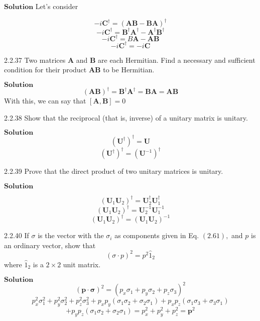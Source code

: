 \documentclass{article}
\begin{document}
\begin{flushleft}
$\boxed{\textbf{Solution}}$ Let's consider

$$-i \mathbf{C}^{\dagger}=(\mathbf{A}\mathbf{B}-\mathbf{B}\mathbf{A})^{\dagger}$$
$$-i \mathbf{C}^{\dagger}=\mathbf{B}^{\dagger} \mathbf{A}^{\dagger}-\mathbf{A}^{\dagger} \mathbf{B}^{\dagger}$$
$$-i \mathbf{C}^{\dagger}=B \mathbf{A}-\mathbf{A}\mathbf{B}$$
$$-i \mathbf{C}^{\dagger}=-i \mathbf{C}$$



\begin{mybox}{2.2.37}
Two matrices $\mathbf{A}$ and $\mathbf{B}$ are each Hermitian. Find a necessary and sufficient condition for
their product $\mathbf{AB}$ to be Hermitian.
\end{mybox}


$\boxed{\textbf{Solution}}$ 
$$(\mathbf{A}\mathbf{B})^{\dagger}=\mathbf{B}^{\dagger} \mathbf{A}^{\dagger}=\mathbf{B} \mathbf{A}=\mathbf{AB}$$
With this, we can say that $[\mathbf{A}, \mathbf{B}] = 0$



\begin{mybox}{2.2.38}
Show that the reciprocal (that is, inverse) of a unitary matrix is unitary.
\end{mybox}


$\boxed{\textbf{Solution}}$ 
$$\left( \mathbf{U}^{\dagger}\right)^{\dagger}=\mathbf{U}$$
$$\left( \mathbf{U}^{\dagger}\right)^{\dagger}=\left( \mathbf{U}^{-1}\right)^{\dagger}$$


\begin{mybox}{2.2.39}
Prove that the direct product of two unitary matrices is unitary.
\end{mybox}

$\boxed{\textbf{Solution}}$ 

$$\left( \mathbf{U}_{1}  \mathbf{U}_{2}\right)^{\dagger}= \mathbf{U}_{2}^{\dagger}  \mathbf{U}_{1}^{\dagger}$$
$$\left( \mathbf{U}_{1}  \mathbf{U}_{2}\right)^{\dagger}= \mathbf{U}_{2}^{-1}  \mathbf{U}_{1}^{-1}$$
$$\left( \mathbf{U}_{1}  \mathbf{U}_{2}\right)^{\dagger}=\left( \mathbf{U}_{1}  \mathbf{U}_{2}\right)^{-1}$$



\begin{mybox}{2.2.40}
If $\sigma$ is the vector with the $\sigma_{i}$ as components given in Eq. $(2.61),$ and $p$ is an ordinary vector, show that
$$(\sigma \cdot p)^{2}=p^{2} \hat{1}_{2}$$
where $\hat{1}_{2}$ is a $2 \times 2$ unit matrix.
\end{mybox}


$\boxed{\textbf{Solution}}$ 
$$(\mathbf{p} \cdot \boldsymbol{\sigma})^{2}=\left(p_{x} \sigma_{1}+p_{y} \sigma_{2}+p_{z} \sigma_{3}\right)^{2}$$
$$p_{x}^{2} \sigma_{1}^{2}+p_{y}^{2} \sigma_{2}^{2}+p_{z}^{2} \sigma_{3}^{2}+p_{x} p_{y}\left(\sigma_{1} \sigma_{2}+\sigma_{2} \sigma_{1}\right)+p_{x} p_{z}\left(\sigma_{1} \sigma_{3}+\sigma_{3} \sigma_{1}\right)$$
$$+p_{y} p_{z}\left(\sigma_{1} \sigma_{2}+\sigma_{2} \sigma_{1}\right)=p_{x}^{2}+p_{y}^{2}+p_{z}^{2}=\mathbf{p}^{2}$$




\end{flushleft}
\end{document}
